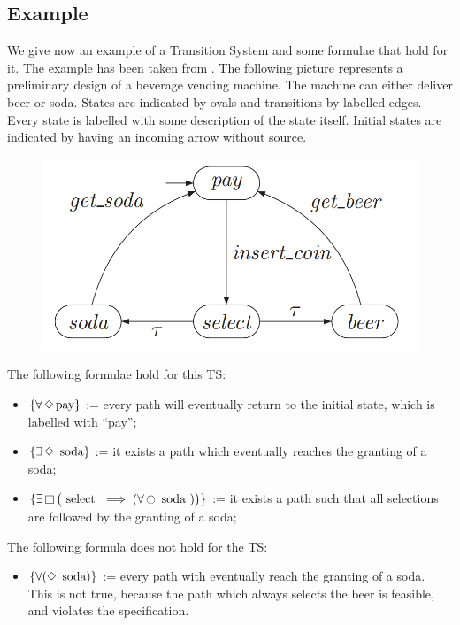 \documentclass{article}
\begin{document}
\subsection{Example} \label{subsec:example}
We give now an example of a Transition System and some formulae that hold for it. The example has been taken from \cite[Paragraph 2.1]{BaKa}.
The following picture represents a preliminary design of a beverage vending machine. The machine can either deliver beer or soda. States are indicated by ovals and transitions by labelled edges. Every state is labelled with some description of the state itself. Initial states are indicated by having an incoming arrow without source.
\begin{figure}[H]
  \begin{center}
      \includegraphics[scale = 0.50]{pictures/example.png}
  \end{center}
\end{figure}
The following formulae hold for this TS:
\begin{itemize}
    \item $\{ \forall \mathop{\Diamond}  \text{pay} \}$ := every path will eventually return to the initial state, which is labelled with ``pay'';
    \item $\{ \exists \mathop{\Diamond} \text{ soda} \}$ := it exists a path which eventually reaches the granting of a soda;
    \item $\{ \exists \mathop{\square} \big(\text{ select } \implies  (\forall \mathop{\ocircle} \text{ soda })\big) \}$ := it exists a path such that all selections are followed by the granting of a soda;
\end{itemize}
The following formula does not hold for the TS:
\begin{itemize}
    \item $\{ \forall (\mathop{\Diamond} \text{ soda}) \}$ := every path with eventually reach the granting of a soda. This is not true, because the path which always selects the beer is feasible, and violates the specification.
\end{itemize}
\end{document}
